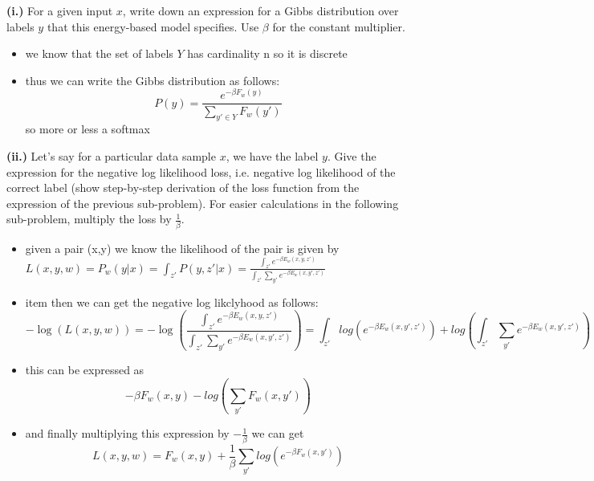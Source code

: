 \documentclass{article}
\begin{document}
\textbf{(i.)} For a given input $x$, write down an expression for a Gibbs distribution over labels $y$ that this energy-based model specifies. Use $\beta$ for the constant multiplier. \\
\begin{itemize}
    \color{red}
    \item we know that the set of labels $Y$ has cardinality n so it is discrete 
    \item thus we can write the Gibbs distribution as follows: $$P(y)=\frac{e^{-\beta F_{w}(y)}}{\sum_{y'\in Y}F_{w}(y')}$$ so more or less a softmax 
\end{itemize}


\textbf{(ii.)} Let’s say for a particular data sample $x$, we have the label $y$. Give the expression for the negative log likelihood loss, i.e. negative log likelihood of the correct label (show step-by-step derivation of the loss function from the expression of the previous sub-problem). For easier calculations in the following sub-problem, multiply the loss by $\frac{1}{\beta}$. \\
\begin{itemize}
    \color{red}
    \item given a pair (x,y) we know the likelihood of the pair is given by $L(x,y,w)=P_{w}(y|x)=\int_{z'}P(y,z'|x)=\frac{\int_{z'}e^{-\beta E_{w}(x, y,z')}}{\int_{z'}\sum_{y'}e^{-\beta E_{w}(x,  y',z')}}$
    \item item then we can get the negative log likclyhood as follows: $$-\log(L(x,y,w))=-\log(\frac{\int_{z'}e^{-\beta E_{w}(x, y,z')}}{\int_{z'}\sum_{y'}e^{-\beta E_{w}(x, y',z')}})=\int_{z'}log(e^{-\beta E_{w}(x, y',z')})+log(\int_{z'}\sum_{y'}e^{-\beta E_{w}(x,y',z')})$$
    \item this can be expressed as $$-\beta F_{w}(x,y)-log(\sum_{y'}F_{w}(x,y'))$$
    \item and finally multiplying this expression by $-\frac{1}{\beta}$ we can get $$L(x,y,w)=F_{w}(x,y)+\frac{1}{\beta}\sum_{y'}log(e^{- \beta F_{w}(x,y')})$$
\end{itemize}
\end{document}
